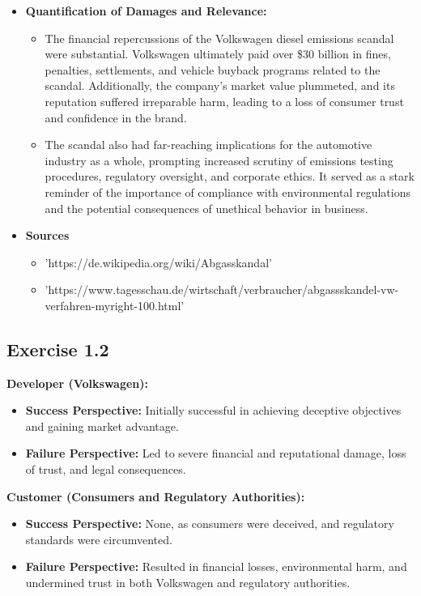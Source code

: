 \documentclass[a4paper]{scrartcl}
\begin{document}
\begin{itemize}
  \item \textbf{Quantification of Damages and Relevance:}
        \begin{itemize}
          \item The financial repercussions of the Volkswagen diesel emissions scandal were substantial.
                Volkswagen ultimately paid over \$30 billion in fines, penalties, settlements, and vehicle buyback programs related to the scandal.
                Additionally, the company's market value plummeted, and its reputation suffered irreparable harm, leading to a loss of consumer trust and confidence in the brand.

          \item The scandal also had far-reaching implications for the automotive industry as a whole, prompting increased scrutiny of emissions testing procedures,
                regulatory oversight, and corporate ethics.
                It served as a stark reminder of the importance of compliance with environmental regulations and the potential consequences of unethical behavior in business.
        \end{itemize}

  \item \textbf{Sources}
        \begin{itemize}
          \item 'https://de.wikipedia.org/wiki/Abgasskandal'
          \item 'https://www.tagesschau.de/wirtschaft/verbraucher/abgassskandel-vw-verfahren-myright-100.html'
        \end{itemize}
\end{itemize}

\subsection*{Exercise 1.2}
\textbf{Developer (Volkswagen):}
\begin{itemize}
  \item \textbf{Success Perspective:} Initially successful in achieving deceptive objectives and gaining market advantage.
  \item \textbf{Failure Perspective:} Led to severe financial and reputational damage, loss of trust, and legal consequences.
\end{itemize}

\textbf{Customer (Consumers and Regulatory Authorities):}
\begin{itemize}
  \item \textbf{Success Perspective:} None, as consumers were deceived, and regulatory standards were circumvented.
  \item \textbf{Failure Perspective:} Resulted in financial losses, environmental harm, and undermined trust in both Volkswagen and regulatory authorities.
\end{itemize}
\end{document}
